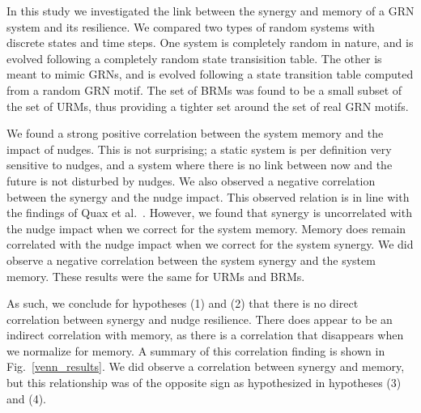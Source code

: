 \documentclass[../main.tex]{subfiles}
\begin{document}

In this study we investigated the link between the synergy and memory of a GRN system and its resilience.
We compared two types of random systems with discrete states and time steps.
One system is completely random in nature, and is evolved following a completely random state transisition table.
The other is meant to mimic GRNs, and is evolved following a state transition table computed from a random GRN motif.
The set of BRMs was found to be a small subset of the set of URMs, thus providing a tighter set around the set of real GRN motifs.

We found a strong positive correlation between the system memory and the impact of nudges.
This is not surprising; a static system is per definition very sensitive to nudges, and a system where there is no link between now and the future is not disturbed by nudges.
We also observed a negative correlation between the synergy and the nudge impact.
This observed relation is in line with the findings of Quax et al.~\cite{quax2017quantifying}.
However, we found that synergy is uncorrelated with the nudge impact when we correct for the system memory.
Memory does remain correlated with the nudge impact when we correct for the system synergy.
We did observe a negative correlation between the system synergy and the system memory.
These results were the same for URMs and BRMs.

As such, we conclude for hypotheses (1) and (2) that there is no direct correlation between synergy and nudge resilience.
There does appear to be an indirect correlation with memory, as there is a correlation that disappears when we normalize for memory.
A summary of this correlation finding is shown in Fig.~\ref{venn_results}.
We did observe a correlation between synergy and memory, but this relationship was of the opposite sign as hypothesized in hypotheses (3) and (4).
\end{document}
